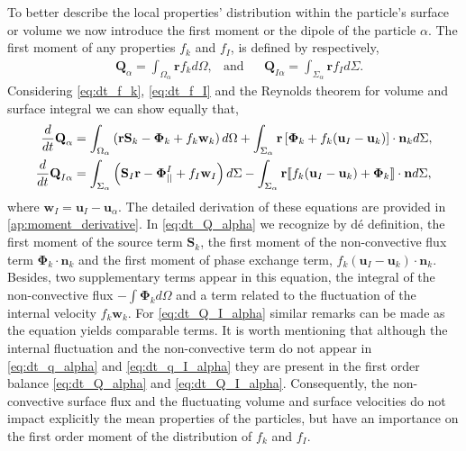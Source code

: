To better describe the local properties' distribution within the particle's surface or volume we now introduce the first moment or the dipole of the particle $\alpha$. 
The first moment of any properties $f_k$ and $f_I$, is defined by respectively,
\begin{align}
    &\textbf{Q}_\alpha 
    = \int_{\Omega_\alpha} \textbf{r} f_k d\Omega,
    &\text{and}&
    &\textbf{Q}_{I\alpha}
    = \int_{\Sigma_\alpha} \textbf{r} f_I d\Sigma.
    \label{eq:first_moment_definition}
\end{align}
Considering \ref{eq:dt_f_k}, \ref{eq:dt_f_I} and the Reynolds theorem for volume and surface integral we can show equally that,
\begin{align}
    \frac{d}{d t} \textbf{Q}_\alpha
    &= \int_{\Omega_\alpha} \left( 
        \textbf{r} \textbf{S}_k 
        - \mathbf{\Phi}_k
        + f_k  \textbf{w}_k 
    \right) d\Omega
    + \int_{\Sigma_\alpha} \textbf{r} \left[
        \mathbf{\Phi}_k
        + f_k (\textbf{u}_I-\textbf{u}_k)
    \right]\cdot \textbf{n}_k  d\Sigma,
    \label{eq:dt_Q_alpha}\\
    \frac{d}{d t} \textbf{Q}_{I\alpha}
    &= \int_{\Sigma_\alpha} \left(
        \textbf{S}_I\textbf{r}
        - \mathbf{\Phi}_{||}^I
        + f_I \textbf{w}_I
    \right) d\Sigma
    - \int_{\Sigma_\alpha}\textbf{r} \llbracket 
        f_k (\textbf{u}_I - \textbf{u}_k)
        + \mathbf{\Phi}_k
     \rrbracket \cdot \textbf{n}
    d\Sigma,
    \label{eq:dt_Q_I_alpha}
\end{align}
where $\textbf{w}_I = \textbf{u}_I - \textbf{u}_\alpha$.
The detailed derivation of these equations are provided in \ref{ap:moment_derivative}. 
In \ref{eq:dt_Q_alpha} we recognize by dé
definition, the first moment of the source term $\textbf{S}_k$, the first moment of the non-convective flux term $\mathbf{\Phi}_k\cdot\textbf{n}_k$ and the first moment of phase exchange term, $f_k (\textbf{u}_I-\textbf{u}_k)\cdot\textbf{n}_k$. 
Besides, two supplementary terms appear in this equation, the integral of the non-convective flux $- \int \mathbf{\Phi}_k d\Omega$ and a term related to the fluctuation of the internal velocity $f_k \textbf{w}_k$.
For \ref{eq:dt_Q_I_alpha} similar remarks can be made as the equation yields comparable terms. 
It is worth mentioning that although the internal fluctuation and the non-convective term do not appear in \ref{eq:dt_q_alpha} and \ref{eq:dt_q_I_alpha} they are present in the first order balance \ref{eq:dt_Q_alpha} and \ref{eq:dt_Q_I_alpha}.
Consequently, the non-convective surface flux and the fluctuating volume and surface velocities do not impact explicitly the mean properties of the particles, but have an importance on the first order moment of the distribution of $f_k$ and $f_I$.  

